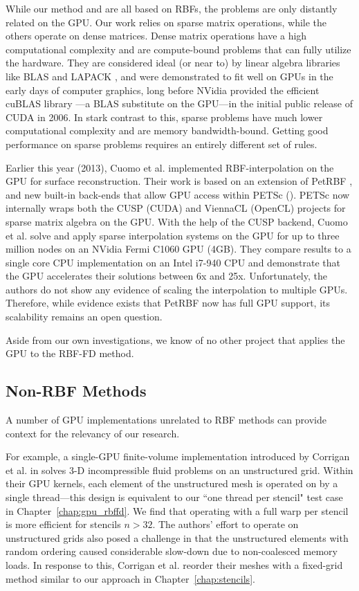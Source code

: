 \documentclass[11pt]{report}
\begin{document}
While our method and \cite{Schmidt2009a,Schmidt2009b,Gumerov2007a, Gumerov2007b} are all based on RBFs, the problems are only distantly related on the GPU. Our work relies on sparse matrix operations, while the others operate on dense matrices. Dense matrix operations have a high computational complexity and are compute-bound problems that can fully utilize the hardware. They are considered ideal (or near to) by linear algebra libraries like BLAS \cite{BLAS} and LAPACK \cite{Lapack1999}, and were demonstrated to fit well on GPUs in the early days of computer graphics, long before NVidia provided the efficient cuBLAS library \cite{CudaToolkitDoc}---a BLAS substitute on the GPU---in the initial public release of CUDA in 2006. In stark contrast to this, sparse problems have much lower computational complexity and are memory bandwidth-bound. Getting good performance on sparse problems requires an entirely different set of rules. 

Earlier this year (2013), Cuomo et al. \cite{Cuomo2013} implemented RBF-interpolation on the GPU for surface reconstruction. Their work is based on an extension of PetRBF \cite{Yokota2010}, and new built-in back-ends that allow GPU access within PETSc (\cite{Minden2010}). PETSc now internally wraps both the CUSP \cite{Cusp2012} (CUDA) and ViennaCL \cite{Rupp2010,Rupp2010a} (OpenCL) projects for sparse matrix algebra on the GPU. With the help of the CUSP backend, Cuomo et al. solve and apply sparse interpolation systems on the GPU for up to three million nodes on an NVidia Fermi C1060 GPU (4GB). They compare results to a single core CPU implementation on an Intel i7-940 CPU and demonstrate that the GPU accelerates their solutions between 6x and 25x. Unfortunately, the authors do not show any evidence of scaling the interpolation to multiple GPUs. Therefore, while evidence exists that PetRBF now has full GPU support, its scalability remains an open question. 


Aside from our own investigations, we know of no other project that applies the GPU to the RBF-FD method. 


\subsection{Non-RBF Methods} 

A number of GPU implementations unrelated to RBF methods can provide context for the relevancy of our research.

For example, a single-GPU finite-volume implementation introduced by Corrigan et al. in \cite{Corrigan2009} solves 3-D incompressible fluid problems on an unstructured grid. Within their GPU kernels, each element of the unstructured mesh is operated on by a single thread---this design is equivalent to our ``one thread per stencil" test case in Chapter~\ref{chap:gpu_rbffd}. We find that operating with a full warp per stencil is more efficient for stencils $n > 32$. The authors' effort to operate on unstructured grids also posed a challenge in that the unstructured elements with random ordering caused considerable slow-down due to non-coalesced memory loads. In response to this, Corrigan et al. reorder their meshes with a fixed-grid method similar to our approach in Chapter~\ref{chap:stencils}. 
\end{document}
